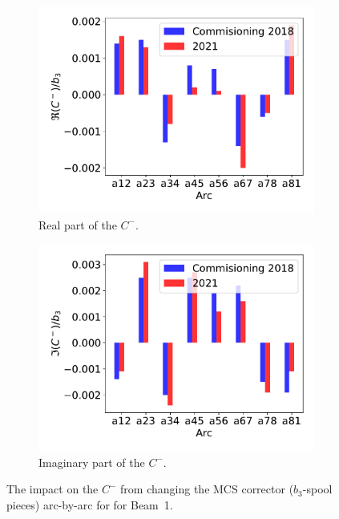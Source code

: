 \documentclass[a4paper]{cernatsnote}
\begin{document}
\begin{figure}[ht]
\begin{subfigure}{.5\textwidth}
  \centering
  \includegraphics[width=.8\linewidth]{plots/MCS/b_1change_re_per_b3.pdf}  
  \caption{Real part of the $C^-$.}
\end{subfigure}
\begin{subfigure}{.5\textwidth}
  \centering
  \includegraphics[width=.8\linewidth]{plots/MCS/b_1change_im_per_b3.pdf}  
  \caption{Imaginary part of the $C^-$.}
\end{subfigure}
\caption{The impact on the $C^-$ from changing the MCS corrector ($b_3$-spool pieces)  arc-by-arc for for Beam~1. }
\label{fig:beam1_mcs}
\end{figure}
\end{document}
